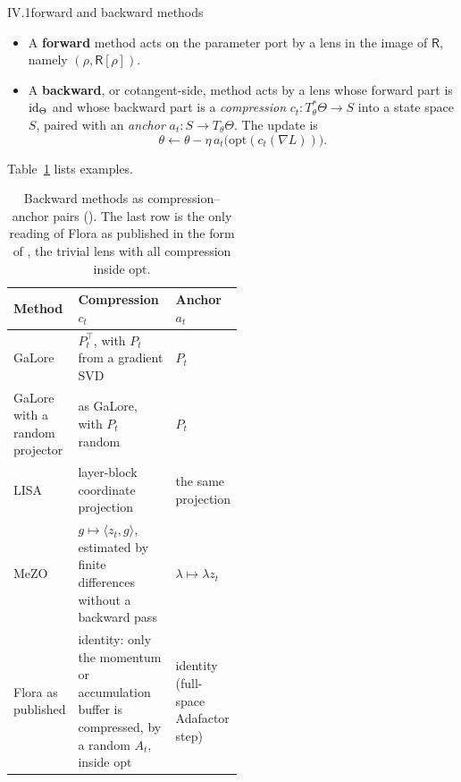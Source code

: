 \begin{definition}{IV.1}{forward and backward methods}
\begin{itemize}
  \item A \textbf{forward} method acts on the parameter port by a lens in the image of $\mathsf R$, namely
  $(\rho,\mathsf R[\rho])$.
  \item A \textbf{backward}, or cotangent-side, method acts by a lens whose forward part is $\mathrm{id}_\Theta$ and whose
  backward part is a \emph{compression} $c_t:T^*_\theta\Theta\to S$ into a state space $S$, paired with an
  \emph{anchor} $a_t:S\to T_\theta\Theta$. The update is
  \begin{equation}\label{eq:lens-backward-update}
    \theta\leftarrow\theta-\eta\,a_t\big(\mathrm{opt}(c_t(\nabla L))\big).
  \end{equation}
\end{itemize}
Table~\ref{tab:lens-backward} lists examples.
\end{definition}

\begin{table}[t]
\centering\footnotesize
\caption{Backward methods as compression--anchor pairs (). The last row is the only reading
of Flora as published in the form of , the trivial lens with all compression inside
$\mathrm{opt}$.}\label{tab:lens-backward}
\begin{tabularx}{\linewidth}{@{}>{\raggedright\arraybackslash}p{0.27\linewidth}>{\raggedright\arraybackslash}X>{\raggedright\arraybackslash}p{0.24\linewidth}@{}}
\toprule
\headrow \textbf{Method} & \textbf{Compression $c_t$} & \textbf{Anchor $a_t$} \\
\midrule
GaLore \citep{zhao2024galore} & $P_t^\top$, with $P_t$ from a gradient SVD & $P_t$ \\
GaLore with a random projector \citep{xtorrobahennigen2025duality,hao2024flora} & as GaLore, with $P_t$ random & $P_t$ \\
LISA \citep{pan2024lisa} & layer-block coordinate projection & the same projection \\
MeZO \citep{malladi2023fine} & $g\mapsto\langle z_t,g\rangle$, estimated by finite differences without a backward pass &
$\lambda\mapsto\lambda z_t$ \\
\midrule
Flora as published \citep{hao2024flora} & identity: only the momentum or accumulation buffer is compressed, by a random
$A_t$, inside $\mathrm{opt}$ & identity (full-space Adafactor step) \\
\bottomrule
\end{tabularx}
\end{table}

